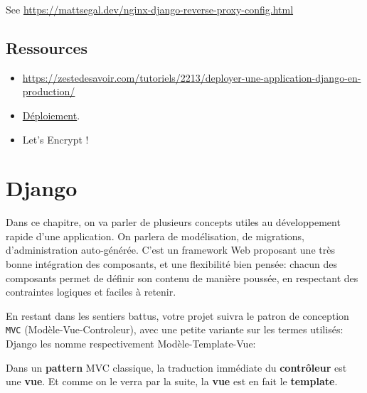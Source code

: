 \documentclass[11pt]{amsbook}
\begin{document}
See \href{https://mattsegal.dev/nginx-django-reverse-proxy-config.html}{https://mattsegal.dev/nginx-django-reverse-proxy-config.html}


\hypertarget{x-ressources}{\chapter{Ressources}}
\begin{itemize}

\item \href{https://zestedesavoir.com/tutoriels/2213/deployer-une-application-django-en-production/}{https://zestedesavoir.com/tutoriels/2213/deployer-une-application-django-en-production/}

\item \href{https://docs.djangoproject.com/fr/3.0/howto/deployment/}{Déploiement}.

\item Let’s Encrypt !

\end{itemize}


\hypertarget{x-django}{\part*{Django}}
Dans ce chapitre, on va parler de plusieurs concepts utiles au développement rapide d’une application. On parlera de modélisation, de migrations, d’administration auto-générée. C’est un framework Web proposant une très bonne intégration des composants, et une flexibilité bien pensée: chacun des composants permet de définir son contenu de manière poussée, en respectant des contraintes logiques et faciles à retenir.


En restant dans les sentiers battus, votre projet suivra le patron de conception \texttt{MVC} (Modèle-Vue-Controleur), avec une petite variante sur les termes utilisés: Django les nomme respectivement Modèle-Template-Vue:


Dans un \textbf{pattern} MVC classique, la traduction immédiate du \textbf{contrôleur} est une \textbf{vue}. Et comme on le verra par la suite, la \textbf{vue} est en fait le \textbf{template}.
\end{document}
